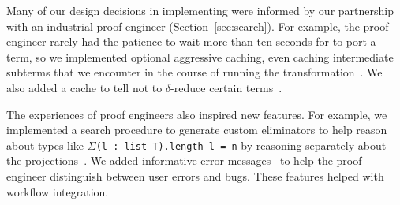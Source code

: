 Many of our design decisions in implementing \toolname were informed by our partnership with
an industrial proof engineer (Section~\ref{sec:search}).
For example, the proof engineer rarely had the patience to wait more than ten seconds
for \toolname to port a term,
so we implemented optional aggressive caching, even caching intermediate subterms that
we encounter in the course of running the transformation~\href{https://github.com/uwplse/pumpkin-pi/blob/silent/plugin/src/cache/caching.ml}{}. %
We also added a cache to tell \toolname not to $\delta$-reduce certain terms~\href{https://github.com/uwplse/pumpkin-pi/blob/silent/plugin/src/cache/caching.ml}{}.


The experiences of proof engineers also inspired new features.
For example, we implemented a search procedure to generate custom eliminators %
to help reason about types like $\Sigma$\lstinline{(l : list T).length l = n}
by reasoning separately about the projections~\href{https://github.com/uwplse/pumpkin-pi/blob/silent/plugin/src/automation/search/smartelim.ml}{}. %
We added informative error messages~\href{https://github.com/uwplse/pumpkin-pi/blob/silent/plugin/src/lib/ornerrors.ml}{} to help the proof engineer distinguish between user errors and bugs. %
These features helped with workflow integration. %

